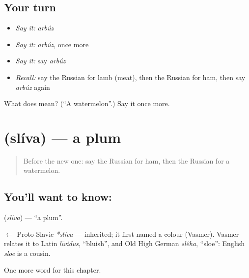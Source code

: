 \subsection*{Your turn}
\begin{itemize}
\raggedright
  \item \emph{Say it:} \emph{arbúz}
  \item \emph{Say it:} \emph{arbúz}, once more
  \item \emph{Say it:} say \emph{arbúz}
  \item \emph{Recall:} say the Russian for lamb (meat), then the Russian for ham, then say \emph{arbúz} again
\end{itemize}

\begin{tcolorbox}[breakable,colback=teal!4,colframe=teal!35!black,title={Before you move on}]
What does  mean? (\textquotedblleft{}A watermelon\textquotedblright{}.) Say it once more.
\end{tcolorbox}
\section[\texorpdfstring{\ru{слива} (slíva)}{слива (slíva)}]{ (slíva) — a plum}

\label{lesson:RU-C250-sliva}



\begin{quote}
Before the new one: say the Russian for ham, then the Russian for a watermelon.
\end{quote}

\subsection*{You'll want to know: }
\textbf{} (\emph{slíva}) — \textquotedblleft{}a plum\textquotedblright{}.

\begin{cousinweb}
\textbf{} $\leftarrow$ Proto-Slavic \emph{*sliva} — inherited; it first named a colour (Vasmer). Vasmer relates it to Latin \emph{līvidus}, \textquotedblleft{}bluish\textquotedblright{}, and Old High German \emph{slêha}, \textquotedblleft{}sloe\textquotedblright{}: English \emph{sloe} is a cousin.
\end{cousinweb}

\begin{grammarlens}[title={What you've built}]
One more word for this chapter.
\end{grammarlens}

